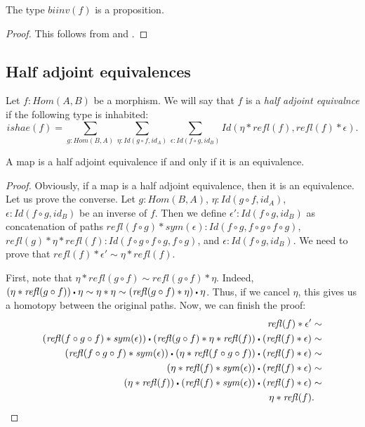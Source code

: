 \documentclass[reqno]{amsart}
\theoremstyle{definition}
\theoremstyle{remark}
\newcommand{\fs}[1]{\mathit{#1}}
\newcommand{\Hom}{\fs{Hom}}
\newcommand{\Id}{\fs{Id}}
\newcommand{\refl}{\fs{refl}}
\newcommand{\sym}{\fs{sym}}
\newcommand{\id}{\fs{id}}
\numberwithin{figure}{section}
\newcommand{\ct}{%
  \mathchoice{\mathbin{\raisebox{0.25ex}{$\displaystyle\centerdot$}}}%
             {\mathbin{\raisebox{0.25ex}{$\centerdot$}}}%
             {\mathbin{\raisebox{0.25ex}{$\scriptstyle\,\centerdot\,$}}}%
             {\mathbin{\raisebox{0.25ex}{$\scriptscriptstyle\,\centerdot\,$}}}
}
\begin{document}
\begin{prop}
The type $\fs{biinv}(f)$ is a proposition.
\end{prop}
\begin{proof}
This follows from  and .
\end{proof}

\subsection{Half adjoint equivalences}

Let $f : \Hom(A,B)$ be a morphism.
We will say that $f$ is a \emph{half adjoint equivalnce} if the following type is inhabited:
\[ \fs{ishae}(f) = \sum_{g : \Hom(B,A)} \sum_{\eta : \Id(g \circ f, \id_A)} \sum_{\epsilon : \Id(f \circ g, \id_B)} \Id(\eta * \refl(f), \refl(f) * \epsilon). \]

\begin{prop}
A map is a half adjoint equivalence if and only if it is an equivalence.
\end{prop}
\begin{proof}
Obviously, if a map is a half adjoint equivalence, then it is an equivalence.
Let us prove the converse.
Let $g : \Hom(B,A)$, $\eta : \Id(g \circ f, \id_A)$, $\epsilon : \Id(f \circ g, \id_B)$ be an inverse of $f$.
Then we define $\epsilon' : \Id(f \circ g, \id_B)$ as concatenation of paths
$\refl(f \circ g) * \sym(\epsilon) : \Id(f \circ g, f \circ g \circ f \circ g)$, $\refl(g) * \eta * \refl(f) : \Id(f \circ g \circ f \circ g, f \circ g)$, and $\epsilon : \Id(f \circ g, \id_B)$.
We need to prove that $\refl(f) * \epsilon' \sim \eta * \refl(f)$.

First, note that $\eta * \refl(g \circ f) \sim \refl(g \circ f) * \eta$.
Indeed, $(\eta * \refl(g \circ f)) \ct \eta \sim \eta * \eta \sim (\refl(g \circ f) * \eta) \ct \eta$.
Thus, if we cancel $\eta$, this gives us a homotopy between the original paths.
Now, we can finish the proof:
\begin{align*}
\refl(f) * \epsilon' & \sim \\
(\refl(f \circ g \circ f) * \sym(\epsilon)) \ct (\refl(g \circ f) * \eta * \refl(f)) \ct (\refl(f) * \epsilon) & \sim \\
(\refl(f \circ g \circ f) * \sym(\epsilon)) \ct (\eta * \refl(f \circ g \circ f)) \ct (\refl(f) * \epsilon) & \sim \\
(\eta * \refl(f) * \sym(\epsilon)) \ct (\refl(f) * \epsilon) & \sim \\
(\eta * \refl(f)) \ct (\refl(f) * \sym(\epsilon)) \ct (\refl(f) * \epsilon) & \sim \\
\eta * \refl(f) & .
\end{align*}
\end{proof}
\end{document}
